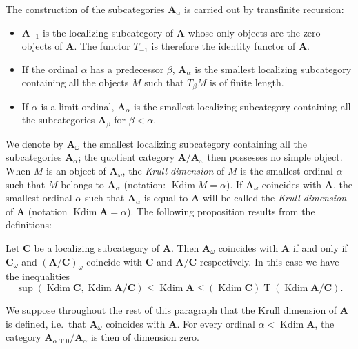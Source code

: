 The construction of the subcategories $\mathbf{A}_\alpha$ is carried
out by transfinite recursion:
\begin{itemize}
\item[---] $\mathbf{A}_{-1}$ is the localizing subcategory of
      $\mathbf{A}$ whose only objects are the zero objects of
      $\mathbf{A}$. The functor $T_{-1}$ is therefore the identity
      functor of $\mathbf{A}$.
\item[---] If the ordinal $\alpha$ has a predecessor $\beta$,
      $\mathbf{A}_\alpha$ is the smallest localizing subcategory
      containing all the objects $M$ such that $T_\beta M$ is of finite
      length.
\item[---] If $\alpha$ is a limit ordinal, $\mathbf{A}_\alpha$ is the
      smallest localizing subcategory containing all the
      subcategories $\mathbf{A}_\beta$ for $\beta < \alpha$.
\end{itemize}

We denote by $\mathbf{A}_\omega$ the smallest localizing subcategory
containing all the subcategories $\mathbf{A}_\alpha$; the quotient
category $\mathbf{A}/\mathbf{A}_\omega$ then possesses no simple
object. When $M$ is an object of $\mathbf{A}_\omega$, the \emph{Krull
dimension} of $M$ is the smallest ordinal $\alpha$ such that $M$
belongs to $\mathbf{A}_\alpha$ (notation:
$\operatorname{Kdim} M = \alpha$). If $\mathbf{A}_\omega$ coincides
with $\mathbf{A}$, the smallest ordinal $\alpha$ such that
$\mathbf{A}_\alpha$ is equal to $\mathbf{A}$ will be called the
\emph{Krull dimension} of $\mathbf{A}$ (notation
$\operatorname{Kdim} \mathbf{A} = \alpha$). The following proposition
results from the definitions:

\begin{proposition}
Let $\mathbf{C}$ be a localizing subcategory of $\mathbf{A}$. Then
$\mathbf{A}_\omega$ coincides with $\mathbf{A}$ if and only if
$\mathbf{C}_\omega$ and $(\mathbf{A}/\mathbf{C})_\omega$ coincide with
$\mathbf{C}$ and $\mathbf{A}/\mathbf{C}$ respectively. In this case we
have the inequalities
\[
\sup(\operatorname{Kdim} \mathbf{C},
\operatorname{Kdim} \mathbf{A}/\mathbf{C}) \le
\operatorname{Kdim} \mathbf{A} \le
(\operatorname{Kdim} \mathbf{C}) \mathbin{T}
(\operatorname{Kdim} \mathbf{A}/\mathbf{C}).
\]
\end{proposition}

We suppose throughout the rest of this paragraph that the Krull
dimension of $\mathbf{A}$ is defined, i.e.\ that
$\mathbf{A}_\omega$ coincides with $\mathbf{A}$. For every ordinal
$\alpha < \operatorname{Kdim} \mathbf{A}$, the category
$\mathbf{A}_{\alpha \mathbin{T} 0}/\mathbf{A}_\alpha$ is then of
dimension zero.

